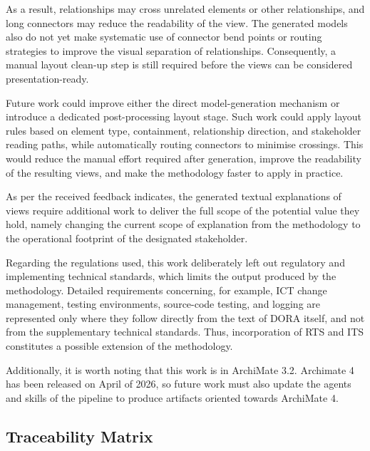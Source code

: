 As a result, relationships may cross unrelated elements or other relationships, and long connectors may reduce the readability of the view. The generated models also do not yet make systematic use of connector bend points or routing strategies to improve the visual separation of relationships. Consequently, a manual layout clean-up step is still required before the views can be considered presentation-ready.

Future work could improve either the direct model-generation mechanism or introduce a dedicated post-processing layout stage. Such work could apply layout rules based on element type, containment, relationship direction, and stakeholder reading paths, while automatically routing connectors to minimise crossings. This would reduce the manual effort required after generation, improve the readability of the resulting views, and make the methodology faster to apply in practice.

As per the received feedback indicates, the generated textual explanations of views require additional work to deliver the full scope of the potential value they hold, namely changing the current scope of explanation from the methodology to the operational footprint of the designated stakeholder.

Regarding the regulations used, this work deliberately left out regulatory and implementing technical standards, which limits the output produced by the methodology. Detailed requirements concerning, for example, \ac{ICT} change management, testing environments, source-code testing, and logging are represented only where they follow directly from the text of \ac{DORA} itself, and not from the supplementary technical standards. Thus, incorporation of \ac{RTS} and \ac{ITS} constitutes a possible extension of the methodology.

Additionally, it is worth noting that this work is in ArchiMate 3.2. Archimate 4 has been released on April of 2026, so future work must also update the agents and skills of the pipeline to produce artifacts oriented towards ArchiMate 4.

\subsection{Traceability Matrix}

